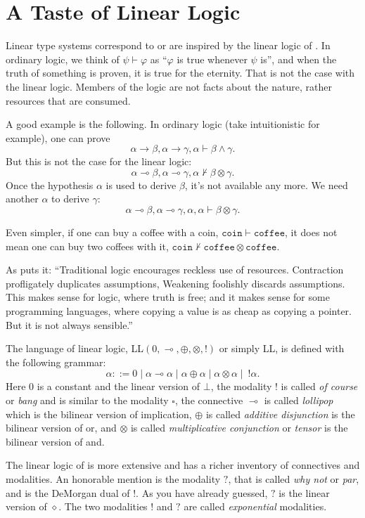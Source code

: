 \section{A Taste of Linear Logic}

Linear type systems correspond to or are inspired by the linear logic of \cite{DBLP:journals/tcs/Girard87}. In ordinary logic, we think of $\psi \vdash \varphi$ as ``$\varphi$ is true whenever $\psi$ is'', and when the truth of something is proven, it is true for the eternity. That is not the case with the linear logic. Members of the logic are not facts about the nature, rather resources that are consumed.

A good example is the following. In ordinary logic (take intuitionistic for example), one can prove
\[
\alpha \rightarrow \beta, \alpha \rightarrow \gamma, \alpha \vdash \beta \wedge \gamma.
\]
But this is not the case for the linear logic:
\[
\alpha \multimap \beta, \alpha \multimap \gamma, \alpha \not\vdash \beta \otimes \gamma.
\]
Once the hypothesis $\alpha$ is used to derive $\beta$, it's not available any more. We need another $\alpha$ to derive $\gamma$:
\[
\alpha \multimap \beta, \alpha \multimap \gamma, \alpha, \alpha \vdash \beta \otimes \gamma.
\]

Even simpler, if one can buy a coffee with a coin, $\mathtt{coin} \vdash \mathtt{coffee}$, it does not mean one can buy two coffees with it, $\mathtt{coin} \not\vdash \mathtt{coffee} \otimes \mathtt{coffee}$.

As \cite{DBLP:conf/mfcs/Wadler93} puts it: ``Traditional logic encourages reckless use of resources. Contraction profligately duplicates assumptions, Weakening foolishly discards assumptions. This makes sense for logic, where truth is free; and it makes sense for some programming languages, where copying a value is as cheap as copying a pointer. But it is not always sensible.''

The language of linear logic, LL$(0, \multimap, \oplus, \otimes, !)$ or simply LL, is defined with the following grammar:
\[
\alpha ::= 0 \mid \alpha \multimap \alpha \mid \alpha \oplus \alpha \mid \alpha \otimes \alpha \mid~ !\alpha.
\]
Here $0$ is a constant and the linear version of $\bot$, the modality $!$ is called \textit{of course} or \textit{bang} and is similar to the modality $\square$, the connective $\multimap$ is called \textit{lollipop} which is the bilinear version of implication, $\oplus$ is called \textit{additive disjunction} is the bilinear version of or, and $\otimes$ is called \textit{multiplicative conjunction} or \textit{tensor} is the bilinear version of and.

The linear logic of \cite{DBLP:journals/tcs/Girard87} is more extensive and has a richer inventory of connectives and modalities. An honorable mention is the modality $?$, that is called \textit{why not} or \textit{par}, and is the DeMorgan dual of $!$. As you have already guessed, $?$ is the linear version of $\diamond$. The two modalities $!$ and $?$ are called \textit{exponential} modalities.
